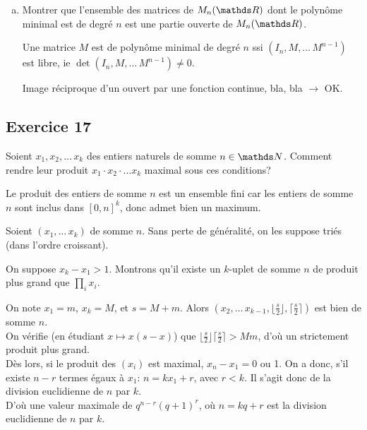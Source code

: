 \documentclass[a4paper, 12pt]{article}
\begin{document}
\begin{enumerate}[a)]
\begin{corr}
			Ainsi, $\mu_M$ est de degré supérieur à $\dim \Vect (I_n, \dots \, M^n) = \rg df(M)$. \\
			
			De plus, si $k \geqslant \deg \mu_M$, $M^k$ se réécrit comme polynôme de degré au plus $\deg \mu_M$ en $M$. (si vous ne savez pas le montrer, ça se fait par récurrence) \\
			
			Ainsi, $\deg \mu_M = \rg df(M) $.
		\end{corr}
		
		\item Montrer que l'ensemble des matrices de $M_n(\R)$ dont le polynôme minimal est de degré $n$ est une partie ouverte de $M_n(\R)$.
		
		\begin{corr}
			Une matrice $M$ est de polynôme minimal de degré $n$ ssi $(I_n, M, \dots\, M^{n-1})$ est libre, ie $\det (I_n, M, \dots\, M^{n-1}) \not = 0$.
			
			Image réciproque d'un ouvert par une fonction continue, bla, bla $\rightarrow$ OK.
		\end{corr}
		
	\end{enumerate}
	
	\subsection*{Exercice 17}
	Soient $x_1, x_2, \dots\, x_k$ des entiers naturels de somme $n \in \N$. Comment rendre leur produit $x_1 \cdot x_2 \cdot\dots x_k$ maximal sous ces conditions?
	
	\begin{corr}
		Le produit des entiers de somme $n$ est un ensemble fini car les entiers de somme $n$ sont inclus dans $[0, n]^k$, donc admet bien un maximum.
		
		Soient $(x_1, \dots \, x_k)$ de somme $n$. Sans perte de généralité, on les suppose triés (dans l'ordre croissant).
		
		On suppose $x_k-x_1>1$. Montrons qu'il existe un $k$-uplet de somme $n$ de produit plus grand que $\prod_i x_i$.
		
		On note $x_1 = m$, $x_k = M$, et $s = M+m$. Alors $(x_2, \dots\, x_{k-1}, \lfloor \frac s 2 \rfloor, \lceil \frac s 2 \rceil)$ est bien de somme $n$. \\
		
		On vérifie (en étudiant $x \mapsto x(s-x)$) que $\lfloor \frac s 2 \rfloor \lceil \frac s 2 \rceil > Mm$, d'où un strictement produit plus grand. \\
		
		Dès lors, si le produit des $(x_i)$ est maximal, $x_n-x_1=0$ ou 1. On a donc, s'il existe $n-r$ termes égaux à $x_1$: $n = kx_1 + r$, avec $r<k$. Il s'agit donc de la division euclidienne de $n$ par $k$. \\
		
		D'où une valeur maximale de $q^{n-r}(q+1)^r$, où $n=kq+r$ est la division euclidienne de $n$ par $k$.
	\end{corr}
\end{document}
